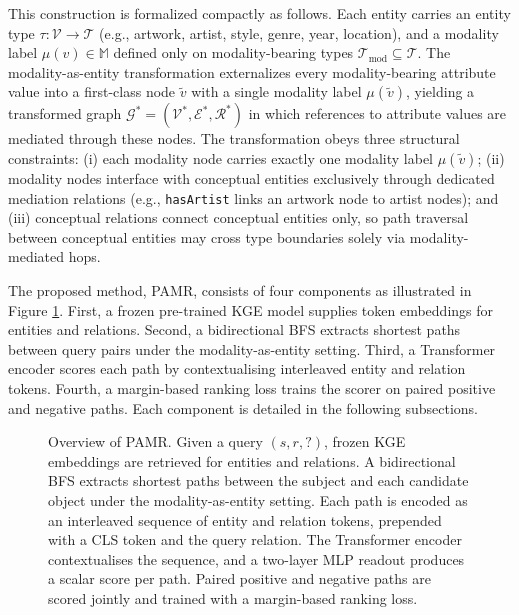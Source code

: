 \documentclass[runningheads]{llncs}
\begin{document}
This construction is formalized compactly as follows. Each entity carries an entity type $\tau: \mathcal{V} \to \mathcal{T}$ (e.g., artwork, artist, style, genre, year, location), and a modality label $\mu(v) \in \mathbb{M}$ defined only on modality-bearing types $\mathcal{T}_{\text{mod}} \subseteq \mathcal{T}$. The modality-as-entity transformation externalizes every modality-bearing attribute value into a first-class node $\tilde{v}$ with a single modality label $\mu(\tilde{v})$, yielding a transformed graph $\mathcal{G}^{*} = (\mathcal{V}^{*}, \mathcal{E}^{*}, \mathcal{R}^{*})$ in which references to attribute values are mediated through these nodes. The transformation obeys three structural constraints: (i) each modality node carries exactly one modality label $\mu(\tilde{v})$; (ii) modality nodes interface with conceptual entities exclusively through dedicated mediation relations (e.g., \texttt{hasArtist} links an artwork node to artist nodes); and (iii) conceptual relations connect conceptual entities only, so path traversal between conceptual entities may cross type boundaries solely via modality-mediated hops.

The proposed method, PAMR, consists of four components as illustrated in Figure \ref{fig:overview}. First, a frozen
pre-trained KGE model supplies token embeddings for entities and relations.
Second, a bidirectional BFS extracts shortest paths between query pairs under the modality-as-entity setting.
Third, a Transformer encoder scores each path by contextualising
interleaved entity and relation tokens. Fourth, a margin-based ranking
loss trains the scorer on paired positive and negative paths. Each
component is detailed in the following subsections.

\begin{figure}[t]
  \centering
  
  \caption{Overview of PAMR. Given a query $(s, r, ?)$, frozen KGE embeddings are retrieved for entities and relations. A bidirectional BFS extracts shortest paths between the subject and each candidate object under the modality-as-entity setting. Each path is encoded as an interleaved sequence of entity and relation tokens, prepended with a CLS token and the query relation. The Transformer encoder contextualises the sequence, and a two-layer MLP readout produces a scalar score per path. Paired positive and negative paths are scored jointly and trained with a margin-based ranking loss.}
  \label{fig:overview}
\end{figure}
\end{document}
